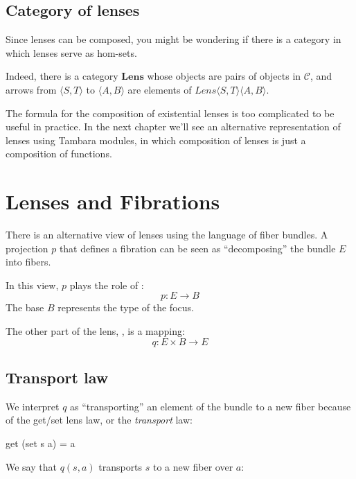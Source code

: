 \documentclass[DaoFP]{subfiles}
\begin{document}
\subsection{Category of lenses}

Since lenses can be composed, you might be wondering if there is a category in which lenses serve as hom-sets. 

Indeed, there is a category $\mathbf{Lens}$ whose objects are pairs of objects in $\mathcal{C}$, and arrows from $\langle S, T\rangle$ to $ \langle A, B \rangle$ are elements of  $\mathit{Lens} \langle S, T\rangle \langle A, B \rangle$.

The formula for the composition of existential lenses is too complicated to be useful in practice. In the next chapter we'll see an alternative representation of lenses using Tambara modules, in which composition of lenses is just a composition of functions.

\section{Lenses and Fibrations}

There is an alternative view of lenses using the language of fiber bundles. A projection $p$ that defines a fibration can be seen as ``decomposing'' the bundle $E$ into fibers. 

In this view, $p$ plays the role of :
\[ p \colon E \to B \]
The base $B$ represents the type of the focus. 

The other part of the lens, , is a mapping: 
\[ q \colon E \times B \to E \]
\subsection{Transport law}

We interpret $q$ as ``transporting'' an element of the bundle to a new fiber because of the get/set lens law, or the \emph{transport} law:
\begin{haskell}
get (set s a) = a
\end{haskell}
We say that $q(s, a)$ transports $s$ to a new fiber over $a$:
\end{document}
